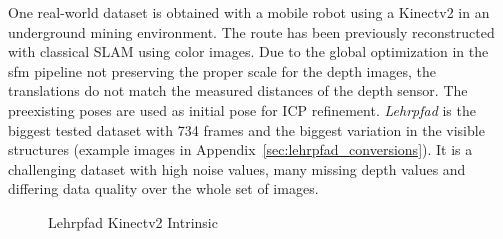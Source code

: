 One real-world dataset is obtained with a mobile robot using a Kinectv2 in an underground mining environment.
The route has been previously reconstructed with classical SLAM using color images.
Due to the global optimization in the \gls{sfm} pipeline not preserving the proper scale for the depth images, the translations do not match the measured distances of the depth sensor.
The preexisting poses are used as initial pose for ICP refinement.
\emph{Lehrpfad} is the biggest tested dataset with 734 frames and the biggest variation in the visible structures (example images in Appendix~\ref{sec:lehrpfad_conversions}).
It is a challenging dataset with high noise values, many missing depth values and differing data quality over the whole set of images.
\begin{figure}[H]
\CenterFloatBoxes%
\begin{floatrow}
    {\caption{Lehrpfad Kinectv2 Intrinsic}\label{tab:lehrpfad_intrinsic}}%
\end{floatrow}
\end{figure}
